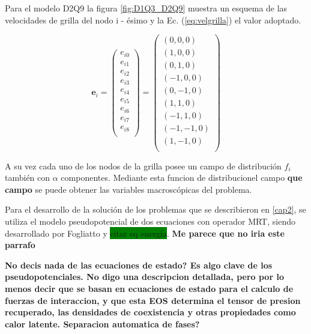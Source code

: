 Para el modelo D2Q9 la figura \ref{fig:D1Q3_D2Q9} muestra un esquema de las velocidades de grilla del nodo i - ésimo y la Ec. (\ref{eq:velgrilla}) el valor adoptado.


\begin{equation}
    {\mathbf{e}}_{i} =  
    \left( \begin{array}{c} 
                e_{i0} \\ e_{i1}\\ e_{i2}\\ e_{i3}\\ e_{i4}\\ e_{i5}\\
                e_{i6}\\ e_{i7}\\ e_{i8}\\
            \end{array}
    \right) =
    \left( \begin{array}{c} 
        (0,0,0) \\ (1,0,0) \\ (0,1,0) \\(-1,0,0) \\ (0,-1,0) \\ (1,1,0) \\
        (-1,1,0) \\ (-1,-1,0) \\ (1,-1,0)\\ 
    \end{array}
    \right) 
    \label{eq:velgrilla}
\end{equation}

A su vez cada uno de los nodos de la grilla posee un campo de distribución $f_{i}$ también con $\alpha$ componentes. Mediante esta funcion de distribucionel campo \textbf{que campo} se puede obtener las variables macroscópicas del problema.

Para el desarrollo de la solución de los problemas que se describieron en \ref{cap2}, se utiliza el modelo pseudopotencial de dos ecuaciones con operador MRT, siendo desarrollado por Fogliatto \cite{fogliatto2018modelado} y \colorbox{green}{citar eq energia}. \textbf{Me parece que no iria este parrafo}


\textbf{No decis nada de las ecuaciones de estado? Es algo clave de los pseudopotenciales. No digo una descripcion detallada, pero por lo menos decir que se basan en ecuaciones de estado para el calculo de fuerzas de interaccion, y que esta EOS determina el tensor de presion recuperado, las densidades de coexistencia y otras propiedades como calor latente. 
Separacion automatica de fases?}


